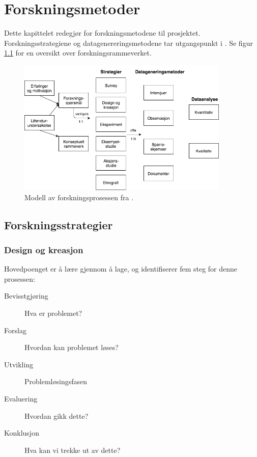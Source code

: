 \chapter{Forskningsmetoder}
\label{ch:method}
Dette kapittelet redegjør for forskningsmetodene til prosjektet. Forskningsstrategiene og datagenereringsmetodene
tar utgangspunkt i \citet{oates}. Se figur \ref{fig:oates_model} for en oversikt over forskningsrammeverket.

\begin{figure}
\centering
\includegraphics[width=0.90\textwidth]{fig/oates/oates_research_norwegian}
\caption{Modell av forskningsprosessen fra \citet{oates}.}
\label{fig:oates_model}
\end{figure}

\section{Forskningsstrategier}

\subsection{Design og kreasjon}
Hovedpoenget er å lære gjennom å lage, og \citet{oates} identifiserer fem steg for denne prosessen:

\begin{description}
  \item[Bevisstgjøring] Hva er problemet?
  \item[Forslag] Hvordan kan problemet løses?
  \item[Utvikling] Problemløsingsfasen
  \item[Evaluering] Hvordan gikk dette?
  \item[Konklusjon] Hva kan vi trekke ut av dette?
\end{description}

